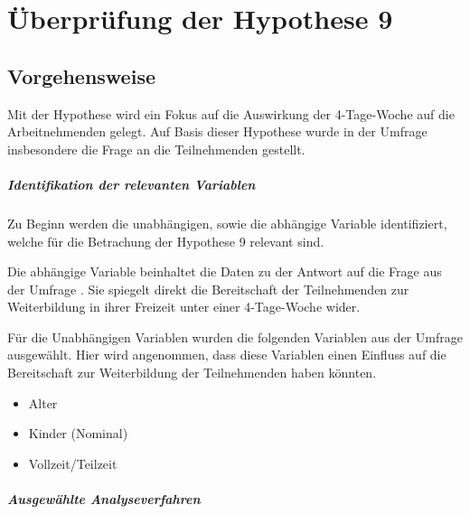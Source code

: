 
\chapter{Überprüfung der Hypothese 9}
\label{chap:hypothese9}

\section{Vorgehensweise}
Mit der Hypothese  wird ein Fokus auf die 
Auswirkung der 4-Tage-Woche auf die Arbeitnehmenden gelegt. Auf Basis dieser Hypothese 
wurde in der Umfrage
insbesondere die Frage  an die Teilnehmenden gestellt.

\paragraph*{Identifikation der relevanten Variablen}

Zu Beginn werden die unabhängigen, sowie die abhängige Variable identifiziert, welche für die Betrachung der
Hypothese 9 relevant sind.

Die abhängige Variable beinhaltet die Daten zu der Antwort auf die Frage aus der Umfrage
.
Sie spiegelt direkt die Bereitschaft der Teilnehmenden zur Weiterbildung in ihrer Freizeit 
unter einer 4-Tage-Woche wider.

Für die Unabhängigen Variablen wurden die folgenden Variablen aus der Umfrage ausgewählt. 
Hier wird angenommen, dass diese Variablen einen Einfluss auf die Bereitschaft zur 
Weiterbildung der Teilnehmenden haben könnten.
\begin{itemize}
    \item Alter
    \item Kinder (Nominal)
    \item Vollzeit/Teilzeit
\end{itemize}


\paragraph*{Ausgewählte Analyseverfahren}

